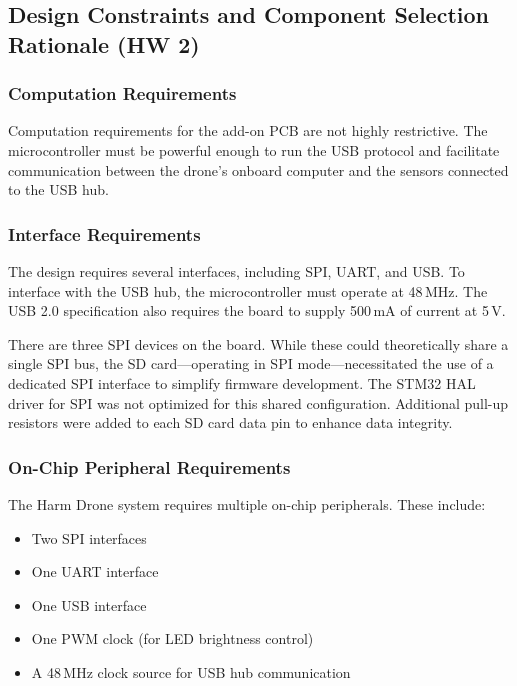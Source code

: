 \documentclass[12pt]{article}
\begin{document}
\subsection{Design Constraints and Component Selection Rationale (HW 2)}

\subsubsection{Computation Requirements}

Computation requirements for the add-on PCB are not highly restrictive. The microcontroller must be powerful enough to run the USB protocol and facilitate communication between the drone’s onboard computer and the sensors connected to the USB hub.

\subsubsection{Interface Requirements}

\par The design requires several interfaces, including SPI, UART, and USB. To interface with the USB hub, the microcontroller must operate at 48\,MHz. The USB 2.0 specification also requires the board to supply 500\,mA of current at 5\,V.

\par There are three SPI devices on the board. While these could theoretically share a single SPI bus, the SD card—operating in SPI mode—necessitated the use of a dedicated SPI interface to simplify firmware development. The STM32 HAL driver for SPI was not optimized for this shared configuration. Additional pull-up resistors were added to each SD card data pin to enhance data integrity.

\subsubsection{On-Chip Peripheral Requirements}

The Harm Drone system requires multiple on-chip peripherals. These include:
\begin{itemize}
    \item Two SPI interfaces
    \item One UART interface
    \item One USB interface
    \item One PWM clock (for LED brightness control)
    \item A 48\,MHz clock source for USB hub communication
\end{itemize}
\end{document}
